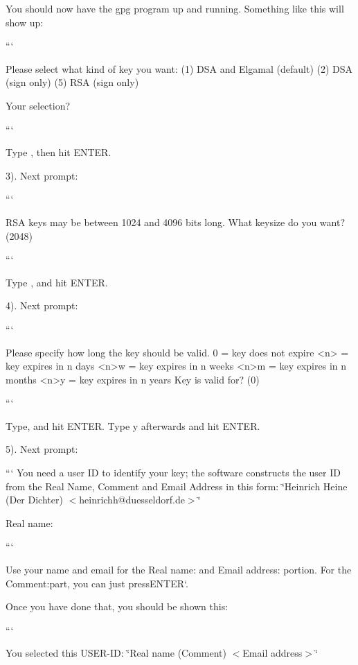 You should now have the {\ttfamily gpg} program up and running. Something like this will show up\-:

``` \begin{DoxyVerb}Please select what kind of key you want:
(1) DSA and Elgamal (default)
(2) DSA (sign only)
(5) RSA (sign only)

Your selection? 
\end{DoxyVerb}


```

Type {}, then hit {\ttfamily E\-N\-T\-E\-R}.

3). Next prompt\-:

``` \begin{DoxyVerb}RSA keys may be between 1024 and 4096 bits long.
What keysize do you want? (2048) 
\end{DoxyVerb}


```

Type {}, and hit {\ttfamily E\-N\-T\-E\-R}.

4). Next prompt\-:

``` \begin{DoxyVerb}Please specify how long the key should be valid.
         0 = key does not expire
      <n>  = key expires in n days
      <n>w = key expires in n weeks
      <n>m = key expires in n months
      <n>y = key expires in n years
Key is valid for? (0) 
\end{DoxyVerb}


```

Type{}, and hit {\ttfamily E\-N\-T\-E\-R}. Type {\ttfamily y} afterwards and hit {\ttfamily E\-N\-T\-E\-R}.

5). Next prompt\-:

``` You need a user I\-D to identify your key; the software constructs the user I\-D from the Real Name, Comment and Email Address in this form\-: \char`\"{}\-Heinrich Heine (\-Der Dichter) $<$heinrichh@duesseldorf.\-de$>$\char`\"{}

Real name\-:

```

Use your name and email for the {\ttfamily Real name\-:} and {\ttfamily Email address\-:} portion. For the {\ttfamily Comment\-:}{\ttfamily part, you can just press}{\ttfamily E\-N\-T\-E\-R}`.

Once you have done that, you should be shown this\-:

```

You selected this U\-S\-E\-R-\/\-I\-D\-: \char`\"{}\-Real name (\-Comment) $<$\-Email address$>$\char`\"{}

